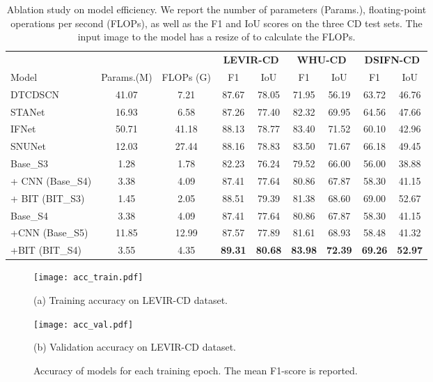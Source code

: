 \documentclass[journal]{IEEEtran}
\begin{document}
\begin{table*}
    \centering
    \caption{Ablation study on model efficiency. We report the number of parameters (Params.), floating-point operations per second (FLOPs), as well as the F1 and IoU scores on the three CD test sets. The input image to the model has a resize of  to calculate the FLOPs.}
\begin{tabular}{l|cc|cc|cc|cc}
    \toprule
    \multicolumn{3}{c}{} &
    \multicolumn{2}{|c|}{\textbf{LEVIR-CD}}  &  \multicolumn{2}{c|}{\textbf{WHU-CD}}  &
    \multicolumn{2}{c}{\textbf{DSIFN-CD}}  \\
    Model & Params.(M) & FLOPs (G) & F1  &  IoU  & F1  &  IoU  & F1  &  IoU  \\
    \midrule
        DTCDSCN \cite{Liu2019b} & 41.07 & 7.21 & 87.67 & 78.05 & 71.95 & 56.19 & 63.72 & 46.76 \\
        STANet \cite{Chen2020e} & 16.93 & 6.58 & 87.26 & 77.40  & 82.32 & 69.95 & 64.56 & 47.66 \\
        IFNet \cite{Zhang2020b} & 50.71 & 41.18 & 88.13 & 78.77  &  83.40 & 71.52  &  60.10 & 42.96  \\
        SNUNet \cite{Fang2021}  & 12.03 & 27.44 & 88.16  & 78.83 &  83.50 &  71.67 &   66.18  &  49.45 \\
        
    \midrule
        Base\_S3 & 1.28 & 1.78  & 82.23 & 76.24  & 79.52 & 66.00 & 56.00 & 38.88 \\
        + CNN (Base\_S4) & 3.38 & 4.09 & 87.41 & 77.64 & 80.86 & 67.87 & 58.30 & 41.15 \\
        + BIT (BIT\_S3)  & 1.45 & 2.05  & 88.51 & 79.39 & 81.38 & 68.60 &  69.00 & 52.67 \\
    \midrule
        Base\_S4 & 3.38 & 4.09 & 87.41 & 77.64 & 80.86 & 67.87 & 58.30 & 41.15 \\
        \multirow{1}{*}{+CNN (Base\_S5)}
         & 11.85 & 12.99 &  87.57&77.89  & 81.61 & 68.93 & 58.48 & 41.32\\
        \multirow{1}{*}{+BIT (BIT\_S4)}
        & 3.55  & 4.35 & \textbf{89.31} & \textbf{80.68}  & \textbf{83.98} & \textbf{72.39} & \textbf{69.26} & \textbf{52.97}\\
    \bottomrule
    \end{tabular}
\label{tab:model_efficiency}
\end{table*}

\begin{figure}
\begin{minipage}[b]{1.0\linewidth}
  \centering
    \texttt{[image: acc\_train.pdf]} 
\centerline{(a) Training accuracy on LEVIR-CD dataset.}\medskip
\end{minipage}
\hfill
\begin{minipage}[b]{1.0\linewidth}
  \centering
    \texttt{[image: acc\_val.pdf]} 
  \centerline{(b) Validation accuracy on LEVIR-CD dataset.}\medskip
\end{minipage}
\caption{Accuracy of models for each training epoch. The mean F1-score is reported.}
\label{fig:training_acc}
\end{figure}
\end{document}
